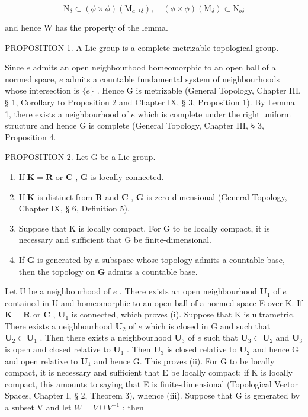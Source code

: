 \[
\mathrm{N} _ {\delta} \subset (\phi \times \phi) (\mathrm{M} _ {a ^ {- 1} \delta}), \quad (\phi \times \phi) (\mathrm{M} _ {\delta}) \subset \mathrm{N} _ {b \delta}
\]

and hence W has the property of the lemma.

PROPOSITION 1. A Lie group is a complete metrizable topological group.

Since \(e\) admits an open neighbourhood homeomorphic to an open ball of a normed space, \(e\) admits a countable fundamental system of neighbourhoods whose intersection is \(\{e\}\) . Hence G is metrizable (General Topology, Chapter III, § 1, Corollary to Proposition 2 and Chapter IX, § 3, Proposition 1). By Lemma 1, there exists a neighbourhood of \(e\) which is complete under the right uniform structure and hence G is complete (General Topology, Chapter III, § 3, Proposition 4.

PROPOSITION 2. Let G be a Lie group.

\begin{enumerate}
\def\labelenumi{(\roman{enumi})}
\item
  If \(\mathbf{K} = \mathbf{R}\) or \(\mathbf{C}\) , \(\mathbf{G}\) is locally connected.
\item
  If \(\mathbf{K}\) is distinct from \(\mathbf{R}\) and \(\mathbf{C}\) , \(\mathbf{G}\) is zero-dimensional (General Topology, Chapter IX, § 6, Definition 5).
\item
  Suppose that K is locally compact. For G to be locally compact, it is necessary and sufficient that G be finite-dimensional.
\item
  If \(\mathbf{G}\) is generated by a subspace whose topology admits a countable base, then the topology on \(\mathbf{G}\) admits a countable base.
\end{enumerate}

Let U be a neighbourhood of \(e\) . There exists an open neighbourhood \(\mathbf{U}_1\) of \(e\) contained in U and homeomorphic to an open ball of a normed space E over K. If \(\mathbf{K} = \mathbf{R}\) or \(\mathbf{C}\) , \(\mathbf{U}_1\) is connected, which proves (i). Suppose that K is ultrametric. There exists a neighbourhood \(\mathbf{U}_2\) of \(e\) which is closed in G and such that \(\mathbf{U}_2 \subset \mathbf{U}_1\) . Then there exists a neighbourhood \(\mathbf{U}_3\) of \(e\) such that \(\mathbf{U}_3 \subset \mathbf{U}_2\) and \(\mathbf{U}_3\) is open and closed relative to \(\mathbf{U}_1\) . Then \(\mathbf{U}_3\) is closed relative to \(\mathbf{U}_2\) and hence G and open relative to \(\mathbf{U}_1\) and hence G. This proves (ii). For G to be locally compact, it is necessary and sufficient that E be locally compact; if K is locally compact, this amounts to saying that E is finite-dimensional (Topological Vector Spaces, Chapter I, § 2, Theorem 3), whence (iii). Suppose that G is generated by a subset V and let \(W = V \cup V^{-1}\) ; then

